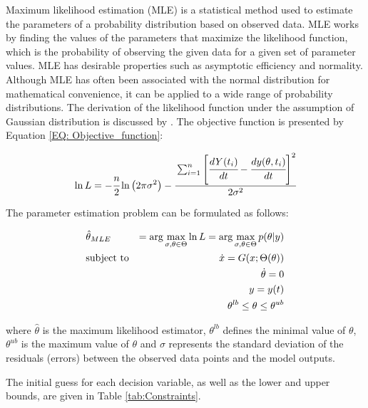 \documentclass[a4paper,fleqn]{cas-dc}
\begin{document}
Maximum likelihood estimation (MLE) is a statistical method used to estimate the parameters of a probability distribution based on observed data. MLE works by finding the values of the parameters that maximize the likelihood function, which is the probability of observing the given data for a given set of parameter values. MLE has desirable properties such as asymptotic efficiency and normality. Although MLE has often been associated with the normal distribution for mathematical convenience, it can be applied to a wide range of probability distributions. The derivation of the likelihood function under the assumption of  Gaussian distribution is discussed by \citet{Himmelblau1970}. The objective function is presented by Equation \ref{EQ: Objective_function}:

{\footnotesize
	\begin{equation} \label{EQ: Objective_function}
		\ln L = -\cfrac{n}{2}  \ln \left(2 \pi \sigma^2\right) 
		- \cfrac{ \sum_{i=1}^{n} \left[  \cfrac{d {Y}(t_i)}{dt} - \cfrac{dy(\theta, t_i)}{dt} \right]^2 }{2 \sigma^2}
	\end{equation}
}

The parameter estimation problem can be formulated as follows:

{\footnotesize
	\begin{equation}
		\begin{aligned} \label{EQ: Optimization_formulation_MLE}
			&\hat{\theta}_{MLE} &= \arg \max_{\sigma, \theta \in \Theta} \ln L = \arg \max_{\sigma,\theta \in \Theta} p(\theta|y) \\
			&\text{subject to}
			& \dot{ x } = G({\color{black} x};\Theta(\theta)) \\
			&& \dot{\theta} = 0 \\
			&& y = y(t) \\
			&& \theta^{lb} \leq \theta \leq \theta^{ub}
		\end{aligned}
\end{equation} } 

where $\hat{\theta}$ is the maximum likelihood estimator, $\theta^{lb}$ defines the minimal value of $\theta$, $\theta^{ub}$ is the maximum value of $\theta$ and $\sigma$ represents the standard deviation of the residuals (errors) between the observed data points and the model outputs.

The initial guess for each decision variable, as well as the lower and upper bounds, are given in Table \ref{tab:Constraints}. 
\end{document}
